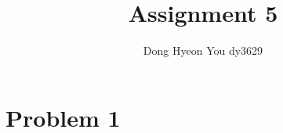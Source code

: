 \documentclass{article}
\title{Assignment 5}
\author{Dong Hyeon You dy3629}
\begin{document}
	\section*{Problem 1}
	
\end{document}
